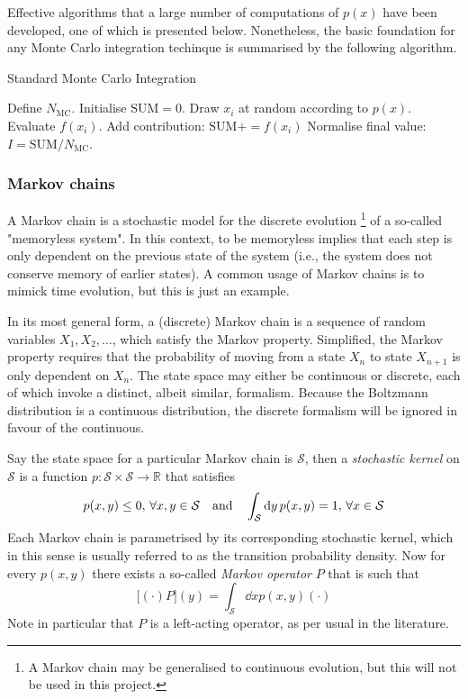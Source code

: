 \documentclass[nofootinbib,reprint,english]{revtex4-1}
\newcommand{\Sspace}{\mathcal{S}}
\begin{document}
Effective algorithms that a large number of computations of \(p(x)\) have been developed, one of which is presented below. Nonetheless, the basic foundation for any Monte Carlo integration techinque is summarised by the following algorithm.
\begin{algorithm}[H]
\caption{Standard Monte Carlo Integration}\label{algo:standard_Monte_Carlo}
\begin{algorithmic}[1]
\State Define \(N_\text{MC}\).
\State Initialise \(\text{SUM}=0\).
	\State Draw \(x_i\) at random according to \(p(x)\).
	\State Evaluate \(f(x_i)\).
	\State Add contribution: \(\text{SUM}\mathrel{{+}{=}}f(x_i)\)
\EndFor
\State Normalise final value: \(I=\text{SUM}/N_\text{MC}\).
\end{algorithmic}
\end{algorithm}

\subsubsection{Markov chains}
A Markov chain is a stochastic model for the discrete evolution \footnote{A Markov chain may be generalised to continuous evolution, but this will not be used in this project.} of a so-called "memoryless system". In this context, to be memoryless implies that each step is only dependent on the previous state of the system (i.e., the system does not conserve memory of earlier states). A common usage of Markov chains is to mimick time evolution, but this is just an example.

In its most general form, a (discrete) Markov chain is a sequence of random variables \(X_1,X_2,\ldots\), which satisfy the Markov property. Simplified, the Markov property requires that the probability of moving from a state \(X_n\) to state \(X_{n+1}\) is only dependent on \(X_n\). The state space may either be continuous or discrete, each of which invoke a distinct, albeit similar, formalism. Because the Boltzmann distribution is a continuous distribution, the discrete formalism will be ignored in favour of the continuous.

Say the state space for a particular Markov chain is \(\mathcal{S}\), then a \emph{stochastic kernel} on \(\Sspace\) is a function \(p:\Sspace\times\Sspace\to\mathbb{R}\) that satisfies
\[p(x,y)\leq0,\,\forall x,y\in\Sspace\qand\int_\Sspace\dd{y}p(x,y)=1,\,\forall x\in\Sspace\]
Each Markov chain is parametrised by its corresponding stochastic kernel, which in this sense is usually referred to as the transition probability density. Now for every \(p(x,y)\) there exists a so-called \emph{Markov operator} \(P\) that is such that
\[\big[(\cdot)P\big](y)=\int_\Sspace\dd{x}p(x,y)(\cdot)\]
Note in particular that \(P\) is a left-acting operator, as per usual in the literature.
\end{document}
